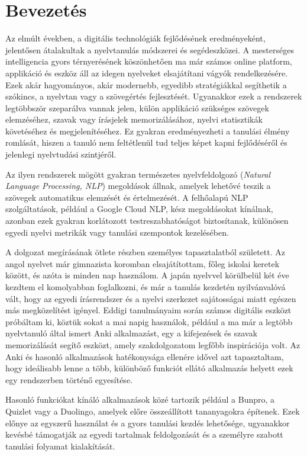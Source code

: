 \chapter{Bevezetés}
\label{ch:intro}

Az elmúlt években, a digitális technológiák fejlődésének eredményeként, jelentősen átalakultak a nyelvtanulás módszerei és segédeszközei. A mesterséges intelligencia gyors térnyerésének köszönhetően ma már számos online platform, applikáció és eszköz áll az idegen nyelveket elsajátítani vágyók rendelkezésére. Ezek akár hagyományos, akár modernebb, egyedibb stratégiákkal segíthetik a szókincs, a nyelvtan vagy a szövegértés fejlesztését. Ugyanakkor ezek a rendszerek legtöbbször szeparálva vannak jelen, külön applikáció szükséges szövegek elemzéséhez, szavak vagy írásjelek memorizálásához, nyelvi statisztikák követéséhez és megjelenítéséhez. Ez gyakran eredményezheti a tanulási élmény romlását, hiszen a tanuló nem feltétlenül tud teljes képet kapni fejlődéséről és jelenlegi nyelvtudási szintjéről.

Az ilyen rendszerek mögött gyakran természetes nyelvfeldolgozó (\textit{Natural Language Processing, NLP}) megoldások állnak, amelyek lehetővé teszik a szövegek automatikus elemzését és értelmezését. A felhőalapú NLP szolgáltatások, például a Google Cloud NLP, kész megoldásokat kínálnak, azonban ezek gyakran korlátozott testreszabhatóságot biztosítanak, különösen egyedi nyelvi metrikák vagy tanulási szempontok kezelésében.

A dolgozat megírásának ötlete részben személyes tapasztalatból született. Az angol nyelvet már gimnazista koromban elsajátítottam, főleg iskolai keretek között, és azóta is minden nap használom. A japán nyelvvel körülbelül két éve kezdtem el komolyabban foglalkozni, és már a tanulás kezdetén nyilvánvalóvá vált, hogy az egyedi írásrendszer és a nyelvi szerkezet sajátosságai miatt egészen más megközelítést igényel. Eddigi tanulmányaim során számos digitális eszközt próbáltam ki, köztük sokat a mai napig használok, például a ma már a legtöbb nyelvtanuló által ismert Anki alkalmazást, egy a kifejezések és szavak memorizálását segítő eszközt, amely szakdolgozatom legfőbb inspirációja volt. Az Anki és hasonló alkalmazások hatékonysága ellenére idővel azt tapasztaltam, hogy ideálisabb lenne a több, különböző funkciót ellátó alkalmazás helyett ezek egy rendszerben történő egyesítése. 

Hasonló funkciókat kínáló alkalmazások közé tartozik például a Bunpro, a Quizlet vagy a Duolingo, amelyek előre összeállított tananyagokra építenek. Ezek előnye az egyszerű használat és a gyors tanulási kezdés lehetősége, ugyanakkor kevésbé támogatják az egyedi tartalmak feldolgozását és a személyre szabott tanulási folyamat kialakítását.

